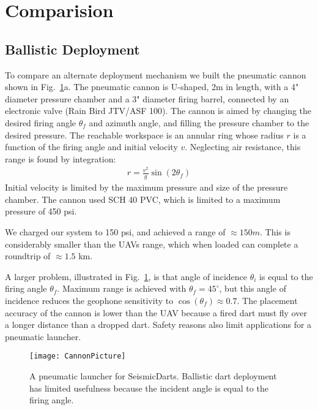 \section{Comparision}\label{sec:Comparision}

\subsection{Ballistic Deployment}
To compare an alternate deployment mechanism we built the pneumatic cannon shown in Fig.~\ref{fig:CannonPicture}a.
The pneumatic cannon is U-shaped,  2m in length, with a 4" diameter pressure chamber and a 3" diameter firing barrel, connected by an electronic valve (Rain Bird JTV/ASF 100). 
The cannon is aimed by changing the desired firing angle $\theta_f$ and azimuth angle, and filling the pressure chamber to the desired pressure.  
The reachable workspace is an annular ring whose radius $r$ is a function of the firing angle and initial velocity $v$. 
Neglecting air resistance, this range is found by integration:
\begin{align}
r = \frac{v^2}{g} \sin( 2 \theta_f )
\end{align} 
Initial velocity is limited by the maximum pressure and size of the pressure chamber.
The cannon used  SCH 40 PVC, which is limited to a maximum pressure of 450 psi.

We charged our system to 150 psi, and achieved a range of $\approx 150 m$.
This is considerably smaller than the UAVs range, which when loaded can complete a roundtrip of $\approx 1.5$ km.

A larger problem, illustrated in Fig.~\ref{fig:CannonPicture}, is that angle of incidence $\theta_i$ is equal to the firing angle $\theta_f$. 
Maximum range is achieved with $\theta_f = 45^\circ$, but this angle of incidence reduces the geophone sensitivity to $\cos(\theta_f )\approx 0.7$.
The placement accuracy of the cannon is lower than the UAV because a fired dart must fly over a longer distance than a dropped dart. 
Safety reasons also limit applications for a pneumatic launcher.


\begin{figure} \centering
  {\texttt{[image: CannonPicture]}}
 \caption{A pneumatic launcher for SeismicDarts.  Ballistic dart deployment has limited usefulness because the incident angle is equal to the firing angle.} 
 \label{fig:CannonPicture}
\end{figure}



